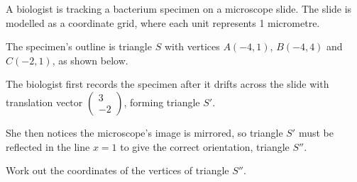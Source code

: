 \begin{question}
\noindent A biologist is tracking a bacterium specimen on a microscope slide. The slide is modelled as a coordinate grid, where each unit represents 1 micrometre.

\noindent The specimen's outline is triangle $S$ with vertices $A(-4,1)$, $B(-4,4)$ and $C(-2,1)$, as shown below.

\begin{center}
\end{center}

\noindent The biologist first records the specimen after it drifts across the slide with translation vector $\begin{pmatrix} 3 \\ -2 \end{pmatrix}$, forming triangle $S'$.

\noindent She then notices the microscope's image is mirrored, so triangle $S'$ must be reflected in the line $x = 1$ to give the correct orientation, triangle $S''$.

\noindent Work out the coordinates of the vertices of triangle $S''$.
\vspace{5cm}
\begin{flushright}
\end{flushright}
\end{question}
